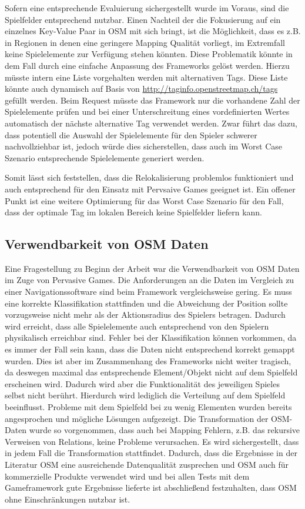 Sofern eine entsprechende Evaluierung sichergestellt wurde im Voraus, sind die Spielfelder entsprechend nutzbar.
Einen Nachteil der die Fokusierung auf ein einzelnes Key-Value Paar in OSM mit sich bringt, ist die Möglichkeit, dass es z.B. in Regionen in denen eine geringere Mapping Qualität vorliegt, im Extremfall keine Spielelemente zur Verfügung stehen könnten. Diese Problematik könnte in dem Fall durch eine einfache Anpassung des Frameworks gelöst werden. Hierzu müsste intern eine Liste vorgehalten werden mit alternativen Tags. Diese Liste könnte auch dynamisch auf Basis von \url{http://taginfo.openstreetmap.ch/tags} gefüllt werden. Beim Request müsste das Framework nur die vorhandene Zahl der Spielelemente prüfen und bei einer Unterschreitung eines vordefinierten Wertes automatisch der nächste alternative Tag verwendet werden. Zwar führt das dazu, dass potentiell die Auswahl der Spielelemente für den Spieler schwerer nachvollziehbar ist, jedoch würde dies sicherstellen, dass auch im Worst Case Szenario entsprechende Spielelemente generiert werden.

Somit lässt sich feststellen, dass die Relokalisierung problemlos funktioniert und auch entsprechend für den Einsatz mit Pervsaive Games geeignet ist. Ein offener Punkt ist eine weitere Optimierung für das Worst Case Szenario für den Fall, dass der optimale Tag im lokalen Bereich keine Spielfelder liefern kann.

\subsection*{Verwendbarkeit von OSM Daten}

Eine Fragestellung zu Beginn der Arbeit war die Verwendbarkeit von OSM Daten im Zuge von Pervasive Games.
Die Anforderungen an die Daten im Vergleich zu einer Navigationssoftware sind beim Framework vergleichsweise gering.
Es muss eine korrekte Klassifikation stattfinden und die Abweichung der Position sollte vorzugsweise nicht mehr als der Aktionsradius des Spielers betragen. Dadurch wird erreicht, dass alle Spielelemente auch entsprechend von den Spielern physikalisch erreichbar sind.
Fehler bei der Klassifikation können vorkommen, da es immer der Fall sein kann, dass die Daten nicht entsprechend korrekt gemappt wurden.
Dies ist aber im Zusammenhang des Frameworks nicht weiter tragisch, da deswegen maximal das entsprechende Element/Objekt nicht auf dem Spielfeld erscheinen wird. Dadurch wird aber die Funktionalität des jeweiligen Spieles selbst nicht berührt. Hierdurch wird lediglich die Verteilung auf dem Spielfeld beeinflusst. Probleme mit dem Spielfeld bei zu wenig Elementen wurden bereits angesprochen und mögliche Lösungen aufgezeigt.
Die Transformation der OSM-Daten wurde so vorgenommen, dass auch bei Mapping Fehlern, z.B. das rekursive Verweisen von Relations, keine Probleme verursachen. Es wird sichergestellt, dass in jedem Fall die Transformation stattfindet.
Dadurch, dass die Ergebnisse in der Literatur OSM eine ausreichende Datenqualität zusprechen und OSM auch für kommerzielle Produkte verwendet wird und bei allen Tests mit dem Gameframework gute Ergebnisse lieferte ist abschließend festzuhalten, dass OSM ohne Einschränkungen nutzbar ist.

